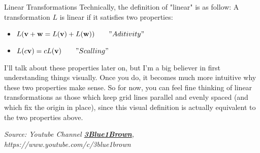 \documentclass[12pt]{beamer}
\begin{document}
	\begin{frame}{Linear Transformations}
		Technically, the definition of "linear" is as follow: A transformation $L$ is linear if it satisfies two properties:
		
		\begin{itemize}
			\item $ L( \mathbf{v} + \mathbf{w} = L( \mathbf{v} )  + L( \mathbf{w} )) \qquad "Aditivity"$ 
			\item $ L(c \mathbf{v} ) = cL( \mathbf{v} ) \qquad "Scalling" $
		\end{itemize}
		\vspace{12px}
		
		I'll talk about these properties later on, but I'm a big believer in first understanding things visually. Once you do, it becomes much more intuitive why these two properties make sense. So for now, you can feel fine thinking of linear transformations as those which keep grid lines parallel and evenly spaced (and which fix the origin in place), since this visual definition is actually equivalent to the two properties above.
		\vspace{8px}
		
		\tiny \textit{Source: Youtube Channel \textbf{\href{https://www.youtube.com/watch?v=kYB8IZa5AuE}{3Blue1Brown}}, https://www.youtube.com/c/3blue1brown} 
		
	\end{frame}
\end{document}
